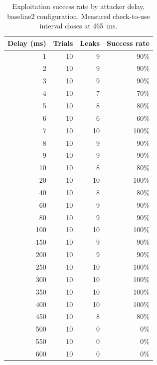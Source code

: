 \begin{table}[ht]
\centering
\begin{tabular}{rrrr}
\hline
Delay (ms) & Trials & Leaks & Success rate \\
\hline
1 & 10 & 9 & 90\% \\
2 & 10 & 9 & 90\% \\
3 & 10 & 9 & 90\% \\
4 & 10 & 7 & 70\% \\
5 & 10 & 8 & 80\% \\
6 & 10 & 6 & 60\% \\
7 & 10 & 10 & 100\% \\
8 & 10 & 9 & 90\% \\
9 & 10 & 9 & 90\% \\
10 & 10 & 8 & 80\% \\
20 & 10 & 10 & 100\% \\
40 & 10 & 8 & 80\% \\
60 & 10 & 9 & 90\% \\
80 & 10 & 9 & 90\% \\
100 & 10 & 10 & 100\% \\
150 & 10 & 9 & 90\% \\
200 & 10 & 9 & 90\% \\
250 & 10 & 10 & 100\% \\
300 & 10 & 10 & 100\% \\
350 & 10 & 10 & 100\% \\
400 & 10 & 10 & 100\% \\
450 & 10 & 8 & 80\% \\
500 & 10 & 0 & 0\% \\
550 & 10 & 0 & 0\% \\
600 & 10 & 0 & 0\% \\
\hline
\end{tabular}
\caption{Exploitation success rate by attacker delay, baseline2 configuration. Measured check-to-use interval closes at 465~ms.}
\label{tab:success-baseline2}
\end{table}
